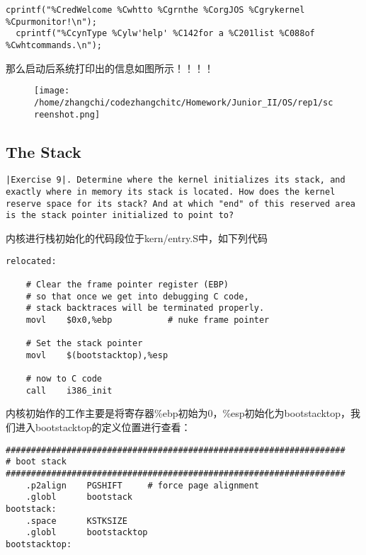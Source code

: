 \documentclass{article}
\begin{document}
\begin{CJK*}{UTF8}{gkai}
\begin{lstlisting}[style=ccode, title={\scriptsize \ttfamily \bfseries kern/monitor.c}]
  cprintf("%CredWelcome %Cwhtto %Cgrnthe %CorgJOS %Cgrykernel %Cpurmonitor!\n");
  cprintf("%CcynType %Cylw'help' %C142for a %C201list %C088of %Cwhtcommands.\n");
\end{lstlisting}

那么启动后系统打印出的信息如图所示！！！！

\begin{figure}[htp]
\centering
\texttt{[image: /home/zhangchi/codezhangchitc/Homework/Junior\_II/OS/rep1/screenshot.png]}
\end{figure}

\subsection{The Stack}

\begin{lstlisting}[style=exercise]
|Exercise 9|. Determine where the kernel initializes its stack, and exactly where in memory its stack is located. How does the kernel reserve space for its stack? And at which "end" of this reserved area is the stack pointer initialized to point to?
\end{lstlisting}

内核进行栈初始化的代码段位于kern/entry.S中，如下列代码

\begin{lstlisting}[style=acode, firstnumber=56, title={\scriptsize \ttfamily \bfseries kern/entry.S}]
relocated:

	# Clear the frame pointer register (EBP)
	# so that once we get into debugging C code,
	# stack backtraces will be terminated properly.
	movl	$0x0,%ebp			# nuke frame pointer

	# Set the stack pointer
	movl	$(bootstacktop),%esp

	# now to C code
	call	i386_init
\end{lstlisting}

内核初始作的工作主要是将寄存器\%ebp初始为0，\%esp初始化为bootstacktop，我们进入bootstacktop的定义位置进行查看：

\begin{lstlisting}[style=acode, firstnumber=83, title={\scriptsize \ttfamily \bfseries kern/entry.S}]
###################################################################
# boot stack
###################################################################
	.p2align	PGSHIFT		# force page alignment
	.globl		bootstack
bootstack:
	.space		KSTKSIZE
	.globl		bootstacktop   
bootstacktop:
\end{lstlisting}


\end{CJK*}
\end{document}
